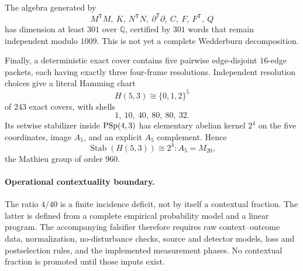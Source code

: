 The algebra generated by
\[
 M^{\mathsf T}M,
 \ K,
 \ N^{\mathsf T}N,
 \ \partial^{\mathsf T}\partial,
 \ C,
 \ F,
 \ F^{\mathsf T},
 \ Q
\]
has dimension at least $301$ over $\mathbb Q$, certified by $301$ words that
remain independent modulo $1009$.  This is not yet a complete Wedderburn
decomposition.

Finally, a deterministic exact cover contains five pairwise edge-disjoint
$16$-edge packets, each having exactly three four-frame resolutions.
Independent resolution choices give a literal Hamming chart
\[
 H(5,3)\cong\{0,1,2\}^5
\]
of $243$ exact covers, with shells
\[
 1,\ 10,\ 40,\ 80,\ 80,\ 32.
\]
Its setwise stabilizer inside $\mathrm{PSp}(4,3)$ has elementary abelian kernel $2^4$
on the five coordinates, image $A_5$, and an explicit $A_5$ complement.  Hence
\[
 \operatorname{Stab}(H(5,3))\cong 2^4\!:\!A_5=M_{20},
\]
the Mathieu group of order $960$.

\paragraph{Operational contextuality boundary.}
The ratio $4/40$ is a finite incidence deficit, not by itself a contextual
fraction.  The latter is defined from a complete empirical probability model
and a linear program.  The accompanying falsifier therefore requires raw
context--outcome data, normalization, no-disturbance checks, source and detector
models, loss and postselection rules, and the implemented measurement phases.
No contextual fraction is promoted until those inputs exist.
